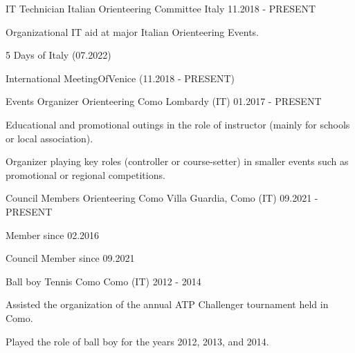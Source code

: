 
\begin{cventries}

    \cventry
    {IT Technician}
    {Italian Orienteering Committee}
    {Italy}
    {11.2018 - PRESENT}
    {
        \begin{cvitems}
            \item {Organizational IT aid at major Italian Orienteering Events.}
            \item {5 Days of Italy (07.2022)}
            \item {International MeetingOfVenice (11.2018 - PRESENT)}
        \end{cvitems}
    }

    \cventry
    {Events Organizer}
    {Orienteering Como}
    {Lombardy (IT)}
    {01.2017 - PRESENT}
    {
        \begin{cvitems}
            \item {Educational and promotional outings in the role of instructor (mainly for schools or local association).}
            \item {Organizer playing key roles (controller or course-setter) in smaller events such as promotional or regional competitions.}
        \end{cvitems}
    }

    \cventry
    {Council Members}
    {Orienteering Como}
    {Villa Guardia, Como (IT)}
    {09.2021 - PRESENT}
    {
        \begin{cvitems}
            \item {Member since 02.2016}
            \item {Council Member since 09.2021}
        \end{cvitems}
    }

    \cventry
    {Ball boy}
    {Tennis Como}
    {Como (IT)}
    {2012 - 2014}
    {
        \begin{cvitems}
            \item {Assisted the organization of the annual ATP Challenger tournament held in Como.}
            \item {Played the role of ball boy for the years 2012, 2013, and 2014.}
        \end{cvitems}
    }

\end{cventries}